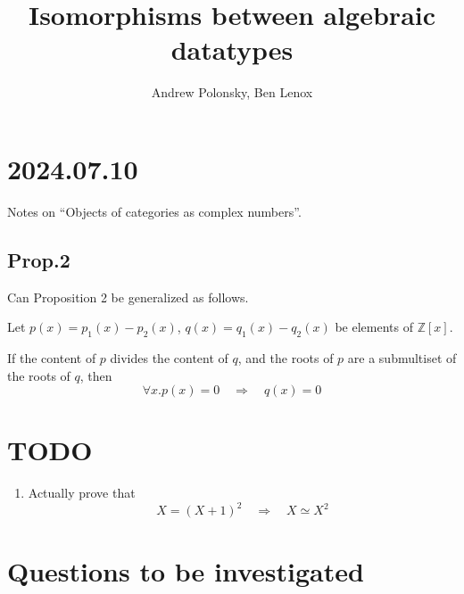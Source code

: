 \documentclass[letterpaper,numbers=enddot]{scrartcl}
\title{Isomorphisms between algebraic datatypes}
\author{Andrew Polonsky, Ben Lenox}
\newcommand{\then}{\quad\mathrel{\Longrightarrow}\quad}
\newcommand{\ints}{\mathbb{Z}}
\begin{document}
\maketitle

\section{2024.07.10}

Notes on ``Objects of categories as complex numbers''.

\subsection{Prop.2}

Can Proposition 2 be generalized as follows.

Let $p(x) = p_1(x)- p_2(x)$, $q(x) = q_1(x)-q_2(x)$ be elements of $\ints[x]$.

If the content of $p$ divides the content of $q$, and
the roots of $p$ are a submultiset of the roots of $q$, then
\[ \forall x. p(x)=0 \then q(x) = 0 \]

\newpage

\section*{TODO}

\begin{enumerate}
  \item Actually prove that
  \[ X=(X+1)^2 \then X \simeq X^2 \]
\end{enumerate}

\newpage
\section{Questions to be investigated}
\end{document}
